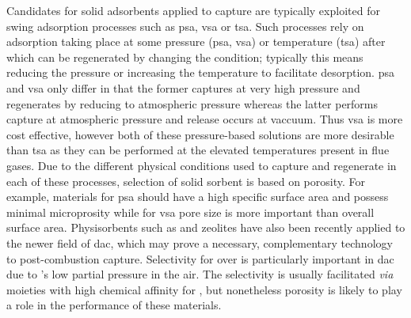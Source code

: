 Candidates for solid \glspl{adsorbent} applied to  capture are typically exploited for swing adsorption processes such as \acrfull{psa}, \acrfull{vsa} or \acrfull{tsa}. Such processes rely on \gls{adsorption} taking place at some pressure (\acrshort{psa}, \acrshort{vsa}) or temperature (\acrshort{tsa}) after which  can be regenerated by changing the condition; typically this means reducing the pressure or increasing the temperature to facilitate desorption.\citep{bahamon2018energetic, hedin2013adsorbents, Zhao2018Synthesis, adewole2013current, ho2008reducing} \acrshort{psa} and \acrshort{vsa} only differ in that the former captures  at very high pressure and regenerates by reducing to atmospheric pressure whereas the latter performs capture at atmospheric pressure and release occurs at vaccuum. Thus \acrshort{vsa} is more cost effective, however both of these pressure-based solutions are more desirable than \acrshort{tsa} as they can be performed at the elevated temperatures present in flue gases.\citep{ho2008reducing, adewole2013current, Pirngruber2013} Due to the different physical conditions used to capture and regenerate  in each of these processes, selection of solid sorbent is based on porosity. For example, materials for \acrshort{psa} should have a high specific surface area and possess minimal microprosity while for \acrshort{vsa} pore size is more important than overall surface area.\citep{ho2008reducing, Chou2004, Presser2011Effect} Physisorbents such as  and zeolites have also been recently applied to the newer field of \acrfull{dac}, which may prove a necessary, complementary technology to post-combustion capture.\citep{kumar2015direct, mcqueen2021review, deutz2021life} Selectivity for  over  is particularly important in \acrshort{dac} due to 's low partial pressure in the air. The selectivity is usually facilitated \textit{via} moieties with high chemical affinity for , but nonetheless porosity is likely to play a role in the performance of these materials.\citep{kumar2015direct, darunte2016direct, deng2021comparative}

